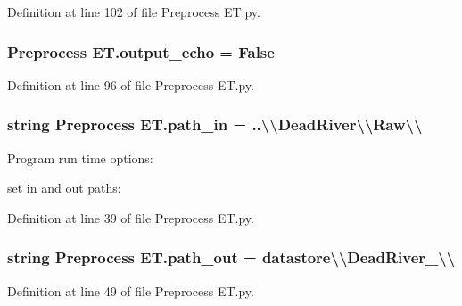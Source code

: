 Definition at line 102 of file Preprocess E\+T.\+py.

\hypertarget{namespace_preprocess_01_e_t_a9a973ca22b7e32bb98c499b9d703589c}{}
\subsubsection[{output\+\_\+echo}]{\setlength{\rightskip}{0pt plus 5cm}Preprocess E\+T.\+output\+\_\+echo = False}\label{namespace_preprocess_01_e_t_a9a973ca22b7e32bb98c499b9d703589c}


Definition at line 96 of file Preprocess E\+T.\+py.

\hypertarget{namespace_preprocess_01_e_t_a151a3a834613bb2467aeccb10f940ef1}{}
\subsubsection[{path\+\_\+in}]{\setlength{\rightskip}{0pt plus 5cm}string Preprocess E\+T.\+path\+\_\+in = \textquotesingle{}..\textbackslash{}\textbackslash{}Dead\+River\textbackslash{}\textbackslash{}\+Raw\textbackslash{}\textbackslash{}\textquotesingle{}}\label{namespace_preprocess_01_e_t_a151a3a834613bb2467aeccb10f940ef1}


Program run time options\+: 

set in and out paths\+: 

Definition at line 39 of file Preprocess E\+T.\+py.

\hypertarget{namespace_preprocess_01_e_t_aa8c626406a6808516d849d8b130cd865}{}
\subsubsection[{path\+\_\+out}]{\setlength{\rightskip}{0pt plus 5cm}string Preprocess E\+T.\+path\+\_\+out = \textquotesingle{}datastore\textbackslash{}\textbackslash{}\+Dead\+River\+\_\textbackslash{}\textbackslash{}\textquotesingle{}}\label{namespace_preprocess_01_e_t_aa8c626406a6808516d849d8b130cd865}


Definition at line 49 of file Preprocess E\+T.\+py.

